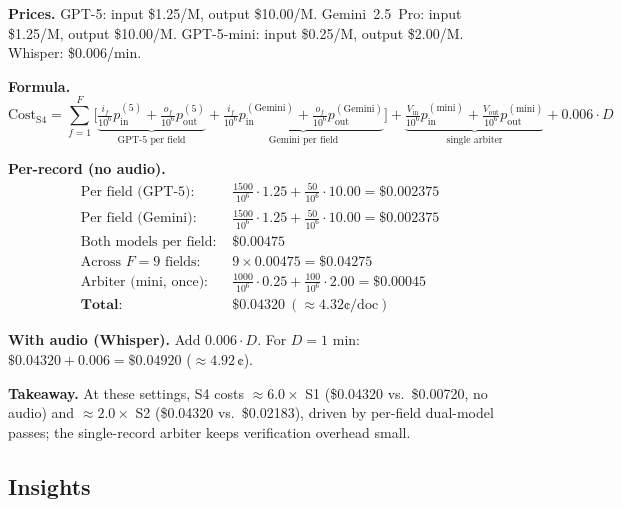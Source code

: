 \textbf{Prices.} GPT-5: input \$1.25/M, output \$10.00/M. Gemini~2.5~Pro: input \$1.25/M, output \$10.00/M. GPT-5-mini: input \$0.25/M, output \$2.00/M. Whisper: \$0.006/min.

\textbf{Formula.}
\[
\text{Cost}_{\text{S4}} =
\sum_{f=1}^{F}\!\Big[
\underbrace{\tfrac{i_f}{10^6}p_{\text{in}}^{(5)} + \tfrac{o_f}{10^6}p_{\text{out}}^{(5)}}_{\text{GPT-5 per field}}
+
\underbrace{\tfrac{i_f}{10^6}p_{\text{in}}^{(\text{Gemini})} + \tfrac{o_f}{10^6}p_{\text{out}}^{(\text{Gemini})}}_{\text{Gemini per field}}
\Big]
+\underbrace{\tfrac{V_{\text{in}}}{10^6}p_{\text{in}}^{(\text{mini})}+\tfrac{V_{\text{out}}}{10^6}p_{\text{out}}^{(\text{mini})}}_{\text{single arbiter}}
+0.006\cdot D
\]

\textbf{Per-record (no audio).}
\[
\begin{aligned}
\text{Per field (GPT-5): } & \tfrac{1500}{10^6}\!\cdot\!1.25 + \tfrac{50}{10^6}\!\cdot\!10.00 = \$0.002375 \\
\text{Per field (Gemini): } & \tfrac{1500}{10^6}\!\cdot\!1.25 + \tfrac{50}{10^6}\!\cdot\!10.00 = \$0.002375 \\
\text{Both models per field: } & \$0.00475 \\
\text{Across }F{=}9\text{ fields: } & 9 \times 0.00475 = \$0.04275 \\
\text{Arbiter (mini, once): } & \tfrac{1000}{10^6}\!\cdot\!0.25 + \tfrac{100}{10^6}\!\cdot\!2.00 = \$0.00045 \\
\textbf{Total: } & \mathbf{\$0.04320}\ (\approx 4.32\text{¢/doc})
\end{aligned}
\]

\textbf{With audio (Whisper).} Add $0.006\cdot D$. For $D{=}1$ min: $\$0.04320+0.006=\mathbf{\$0.04920}$ (\(\approx 4.92\,\text{¢}\)).

\textbf{Takeaway.} At these settings, S4 costs $\approx 6.0\times$ S1 (\$0.04320 vs.\ \$0.00720, no audio) and $\approx 2.0\times$ S2 (\$0.04320 vs.\ \$0.02183), driven by per-field dual-model passes; the single-record arbiter keeps verification overhead small.



\subsection*{Insights}

